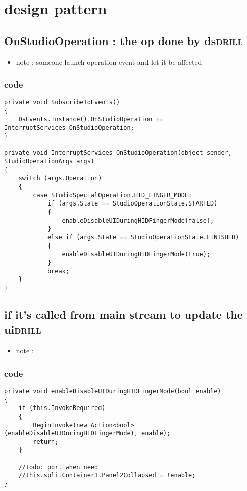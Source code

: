 \documentclass[11pt]{article}
\author{raflin}
\date{\today}
\title{}
\begin{document}
\tableofcontents

\section{design pattern}
\label{sec:orgb024300}

\subsection{OnStudioOperation : the op done by ds\hfill{}\textsc{drill}}
\label{sec:orged89243}
\begin{itemize}
\item note : someone launch operation event and let it be affected
\end{itemize}

\subsubsection{code}
\label{sec:org90231f3}
\begin{verbatim}
private void SubscribeToEvents()
{
    DsEvents.Instance().OnStudioOperation += InterruptServices_OnStudioOperation;
}

private void InterruptServices_OnStudioOperation(object sender, StudioOperationArgs args)
{
    switch (args.Operation)
    {
        case StudioSpecialOperation.HID_FINGER_MODE:
            if (args.State == StudioOperationState.STARTED)
            {
                enableDisableUIDuringHIDFingerMode(false);
            }
            else if (args.State == StudioOperationState.FINISHED)
            {
                enableDisableUIDuringHIDFingerMode(true);
            }
            break;
    }
}

\end{verbatim}

\subsection{if it's called from main stream to update the ui\hfill{}\textsc{drill}}
\label{sec:org00471d6}
\begin{itemize}
\item note :
\end{itemize}
\subsubsection{code}
\label{sec:org228cd63}
\begin{verbatim}
private void enableDisableUIDuringHIDFingerMode(bool enable)
{
    if (this.InvokeRequired)
    {
        BeginInvoke(new Action<bool>(enableDisableUIDuringHIDFingerMode), enable);
        return;
    }

    //todo: port when need 
    //this.splitContainer1.Panel2Collapsed = !enable;
}

\end{verbatim}
\end{document}
